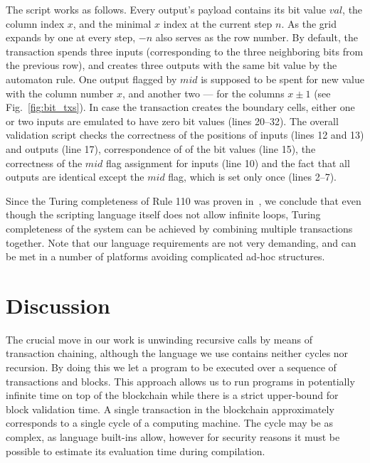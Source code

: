 \documentclass[runningheads]{llncs}
\begin{document}
	The script works as follows. Every output's payload contains its bit value
    $val$, 
    the column index $x$, and the minimal $x$ index at the current step $n$.
    As the
    grid expands by one at every step, $-n$ also serves as the row number. By
    default, the transaction spends three inputs (corresponding to the three
    neighboring bits from the previous row), and creates three outputs with the same
    bit value by the automaton rule. One output flagged by $mid$ is supposed to be
    spent for new value with the column number $x$, and another two --- for the
    columns $x\pm 1$ (see Fig.~\ref{fig:bit_txs}). In case the transaction creates the
    boundary cells, either one or two inputs are emulated to have zero bit values
    (lines 20--32).  The overall validation script checks the correctness of the
    positions of inputs (lines 12 and 13) and outputs (line 17), correspondence of
    of the bit values (line 15), the correctness of the $mid$  flag assignment for
    inputs (line 10) and the fact that all outputs are identical except the $mid$
    flag, which is set only once (lines 2--7).

    Since the Turing completeness of Rule 110 was proven
    in~\cite{cook2004universality}, we conclude that even though the scripting
    language itself does not allow infinite loops, Turing completeness of the
    system can be achieved by combining multiple transactions together. Note
    that our language requirements are not very demanding, and can be met in a 
    number of platforms avoiding complicated ad-hoc structures.

    \section{Discussion}
    \label{section3}

    The crucial move in our work is unwinding recursive calls by means
    of transaction chaining, although the language we use contains neither cycles nor
    recursion. By doing this we let a program to be executed over a sequence of
    transactions and blocks. This approach allows us to run programs in potentially infinite time on top 
    of the blockchain while there is a strict upper-bound for block validation time. %
    A single transaction in the blockchain approximately corresponds to a single
    cycle of a computing machine.
    The cycle may be as complex, as language built-ins allow, however for
    security reasons it must be possible to estimate its evaluation time during
    compilation.
\end{document}
